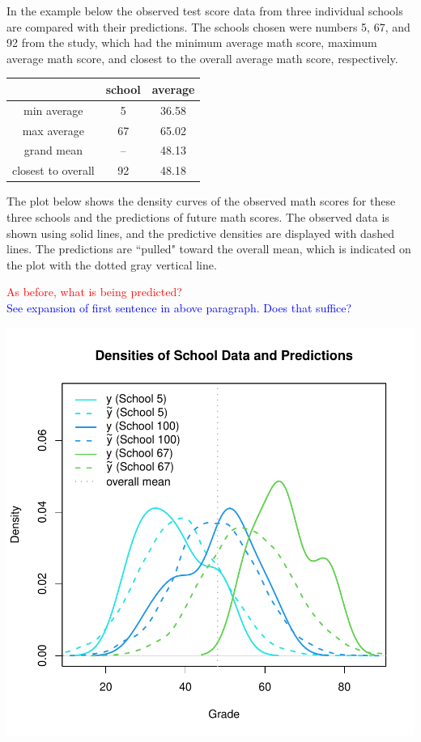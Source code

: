 \documentclass[12pt, a4paper]{article}
\begin{document}
\noindent In the example below the observed test score data from three individual schools are compared with their predictions.  The schools chosen were numbers 5, 67, and 92 from the study, which had the minimum average math score, maximum average math score, and closest to the overall average math score, respectively.


\begin{center}
  \begin{tabular}{|c|c|c|}
    \hline
    & school & average \\
    \hline
    min average & 5 & 36.58 \\
    \hline
    max average & 67 & 65.02 \\
    \hline
    grand mean & -- & 48.13 \\
    \hline
    closest to overall & 92 & 48.18\\
    \hline
  \end{tabular}
\end{center}

\noindent The plot below shows the density curves of the observed math scores for these three schools and the predictions of future math scores.  The observed data is shown using solid lines, and the predictive densities are displayed with dashed lines.  The predictions are ``pulled" toward the overall mean, which is indicated on the plot with the dotted gray vertical line.

\textcolor{red}{As before, what is being predicted?}\\
\textcolor{blue}{See expansion of first sentence in above paragraph.  Does that suffice?}

\includegraphics{Thesis_v4-011}
\end{document}
